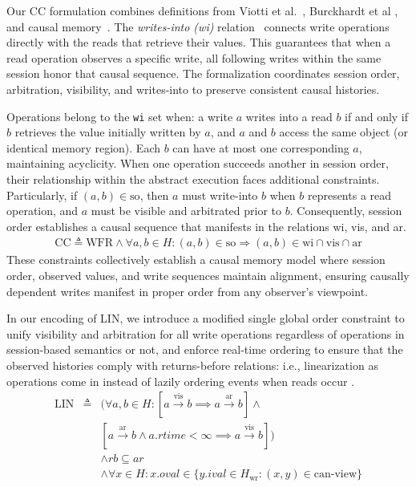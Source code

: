   Our CC formulation combines definitions from Viotti et
  al.~\cite{viotti2016consistency}, Burckhardt et al
  \cite{burckhardt2014principles}, and causal
  memory~\cite{baldoni2002an}. The \textit{writes-into (wi)}
  relation~\cite{baldoni2002an} connects write operations directly with the
  reads that retrieve their values. This guarantees that when
  a read operation observes a specific write, all following writes
  within the same session honor that causal sequence. The formalization
  coordinates session order, arbitration, visibility, and writes-into to
  preserve consistent causal histories.

  Operations belong to the \texttt{wi} set when: a write $a$
  writes into a read $b$ if and only if $b$ retrieves the value
  initially written
  by $a$, and $a$ and $b$ access the same object (or identical memory region).
  Each $b$ can have at most one corresponding $a$, maintaining acyclicity.
  When one operation succeeds another in session order, their
  relationship within the abstract execution faces additional constraints.
  Particularly, if $(a, b) \in \text{so}$, then $a$ must write-into $b$ when
  $b$ represents a read operation, and $a$ must be visible and
  arbitrated prior to $b$. Consequently, session order establishes a causal
  sequence that manifests in the relations wi, vis, and ar.
  \begin{eqnarray*}
    \text{CC} \triangleq \text{WFR} \land \forall a, b \in H: (a, b) \in
    \text{so} \Rightarrow (a, b) \in \text{wi} \cap \text{vis} \cap \text{ar}
  \end{eqnarray*}
  These constraints collectively establish a causal memory model where
  session order, observed values, and write sequences maintain
  alignment, ensuring
  causally dependent writes manifest in proper order from any
  observer's viewpoint.

   In our encoding of LIN,
  we introduce a modified single global order constraint to unify visibility and
  arbitration for all write operations regardless of operations in
  session-based semantics or not, and enforce real-time ordering to
  ensure that the observed histories comply with returns-before relations:
  i.e., linearization as operations come in instead of lazily ordering
  events when
  reads occur \cite{zhang2018building}.
  \begin{eqnarray*}
    \text{LIN} & \triangleq & (\forall a, b \in H: [a
      \xrightarrow{\text{vis}} b \implies a \xrightarrow{\text{ar}} b] \land  \\
      & & [a \xrightarrow{\text{ar}} b \land a.rtime < \infty \implies
    a \xrightarrow{\text{vis}} b]) \\
    & & \land rb \subseteq ar \\
    & & \land \forall x \in H: x.oval \in \{y.ival \in H_\text{wr} : (x,
    y) \in \text{can-view}\}
  \end{eqnarray*}

